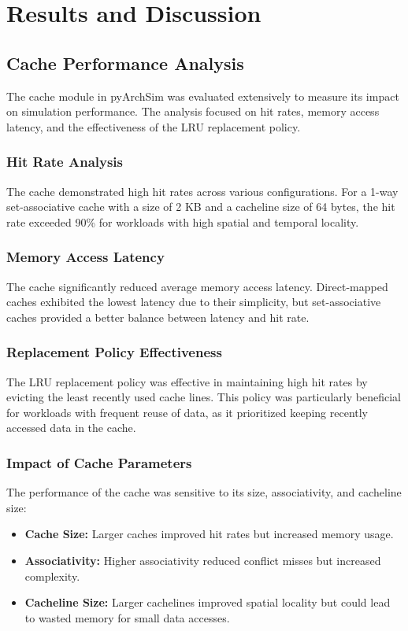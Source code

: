 \documentclass[12pt,a4paper]{report}
\begin{document}
\section{Results and Discussion}
\subsection{Cache Performance Analysis}
The cache module in pyArchSim was evaluated extensively to measure its impact on simulation performance. The analysis focused on hit rates, memory access latency, and the effectiveness of the LRU replacement policy\cite{gfg_lru_cache}.

\subsubsection{Hit Rate Analysis}
The cache demonstrated high hit rates across various configurations. For a 1-way set-associative cache with a size of 2 KB and a cacheline size of 64 bytes, the hit rate exceeded 90\% for workloads with high spatial and temporal locality.

\subsubsection{Memory Access Latency}
The cache significantly reduced average memory access latency. Direct-mapped caches exhibited the lowest latency due to their simplicity, but set-associative caches provided a better balance between latency and hit rate.

\subsubsection{Replacement Policy Effectiveness}
The LRU replacement policy was effective in maintaining high hit rates by evicting the least recently used cache lines. This policy was particularly beneficial for workloads with frequent reuse of data, as it prioritized keeping recently accessed data in the cache.

\subsubsection{Impact of Cache Parameters}
The performance of the cache was sensitive to its size, associativity, and cacheline size:
\begin{itemize}
  \item \textbf{Cache Size:} Larger caches improved hit rates but increased memory usage.
  \item \textbf{Associativity:} Higher associativity reduced conflict misses but increased complexity.
  \item \textbf{Cacheline Size:} Larger cachelines improved spatial locality but could lead to wasted memory for small data accesses.
\end{itemize}
\end{document}
